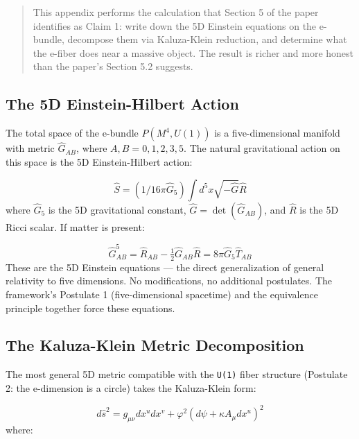 \documentclass[aps,prd,preprint,superscriptaddress,longbibliography,floatfix]{revtex4-2}
\theoremstyle{remark}
\begin{document}
\begin{quote}
This appendix performs the calculation that Section 5 of the paper
identifies as Claim 1: write down the 5D Einstein equations on the
e-bundle, decompose them via Kaluza-Klein reduction, and determine
what the e-fiber does near a massive object. The result is richer
and more honest than the paper's Section 5.2 suggests.
\end{quote}



\subsection{The 5D Einstein-Hilbert Action}

The total space of the e-bundle $P(M^{4}, U(1))$ is a five-dimensional manifold with metric $\hat{G}_{AB}$, where $A, B = 0, 1, 2, 3, 5$. The natural gravitational action on this space is the 5D Einstein-Hilbert action:


\begin{equation}
    \hat{S} = (1 / 16\pi\hat{G}_{5}) \int d^{5}x \sqrt{-\hat{G}} \hat{R}
\end{equation}
where $\hat{G}_{5}$ is the 5D gravitational constant, $\hat{G} = \det(\hat{G}_{AB})$, and \texttt{$\hat{R}$} is the 5D Ricci scalar. If matter is present:


\begin{equation}
    \hat{G}_{AB}^{5} = \hat{R}_{AB} - \tfrac{1}{2}\hat{G}_{AB} \hat{R} = 8\pi\hat{G}_{5} \hat{T}_{AB}
\end{equation}
These are the 5D Einstein equations --- the direct generalization of general relativity to five dimensions. No modifications, no additional postulates. The framework's Postulate 1 (five-dimensional spacetime) and the equivalence principle together force these equations.



\subsection{The Kaluza-Klein Metric Decomposition}

The most general 5D metric compatible with the \texttt{U(1)} fiber structure (Postulate 2: the e-dimension is a circle) takes the Kaluza-Klein form:


\begin{equation}
    d\hat{s}^{2} = g_{\mu\nu} dx^{u}dx^{v} + \varphi^{2}(d\psi + \kappa A_{\mu} dx^{u})^{2}
\end{equation}
where:
\end{document}
